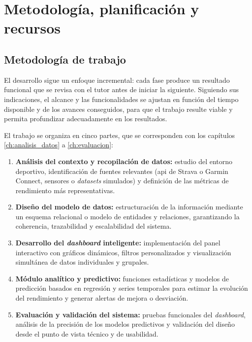 \chapter{Metodología, planificación y recursos}
\label{ch:metodologia}


\section{Metodología de trabajo}
\label{sec:metodologia}

El desarrollo sigue un enfoque incremental: cada fase produce un resultado funcional que se revisa con el tutor antes de iniciar la siguiente. Siguiendo sus indicaciones, el alcance y las funcionalidades se ajustan en función del tiempo disponible y de los avances conseguidos, para que el trabajo resulte viable y permita profundizar adecuadamente en los resultados.

El trabajo se organiza en cinco partes, que se corresponden con los capítulos \ref{ch:analisis_datos} a \ref{ch:evaluacion}:

\begin{enumerate}
    \item \textbf{Análisis del contexto y recopilación de datos:} estudio del entorno deportivo, identificación de fuentes relevantes (\gls{api} de Strava o Garmin Connect, sensores o \textit{datasets} simulados) y definición de las métricas de rendimiento más representativas.
    \item \textbf{Diseño del modelo de datos:} estructuración de la información mediante un esquema relacional o modelo de entidades y relaciones, garantizando la coherencia, trazabilidad y escalabilidad del sistema.
    \item \textbf{Desarrollo del \textit{dashboard} inteligente:} implementación del panel interactivo con gráficos dinámicos, filtros personalizados y visualización simultánea de datos individuales y grupales.
    \item \textbf{Módulo analítico y predictivo:} funciones estadísticas y modelos de predicción basados en regresión y series temporales para estimar la evolución del rendimiento y generar alertas de mejora o desviación.
    \item \textbf{Evaluación y validación del sistema:} pruebas funcionales del \textit{dashboard}, análisis de la precisión de los modelos predictivos y validación del diseño desde el punto de vista técnico y de usabilidad.
\end{enumerate}


